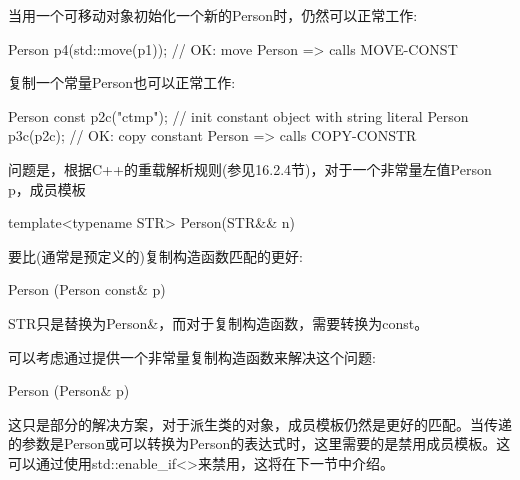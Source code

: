 当用一个可移动对象初始化一个新的Person时，仍然可以正常工作:

\begin{cpp}
Person p4(std::move(p1)); // OK: move Person => calls MOVE-CONST
\end{cpp}

复制一个常量Person也可以正常工作:

\begin{cpp}
Person const p2c("ctmp"); // init constant object with string literal
Person p3c(p2c); // OK: copy constant Person => calls COPY-CONSTR
\end{cpp}

问题是，根据C++的重载解析规则(参见16.2.4节)，对于一个非常量左值Person p，成员模板

\begin{cpp}
template<typename STR>
Person(STR&& n)
\end{cpp}

要比(通常是预定义的)复制构造函数匹配的更好:

\begin{cpp}
Person (Person const& p)
\end{cpp}

STR只是替换为Person\&，而对于复制构造函数，需要转换为const。

可以考虑通过提供一个非常量复制构造函数来解决这个问题:

\begin{cpp}
Person (Person& p)
\end{cpp}

这只是部分的解决方案，对于派生类的对象，成员模板仍然是更好的匹配。当传递的参数是Person或可以转换为Person的表达式时，这里需要的是禁用成员模板。这可以通过使用std::enable\_if<>来禁用，这将在下一节中介绍。
































